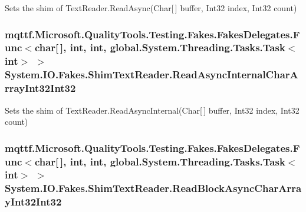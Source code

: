 Sets the shim of Text\-Reader.\-Read\-Async(\-Char\mbox{[}$\,$\mbox{]} buffer, Int32 index, Int32 count)

\hypertarget{class_system_1_1_i_o_1_1_fakes_1_1_shim_text_reader_acd60c65af91032033b97ce9dbbd2d136}{
\subsubsection[{Read\-Async\-Internal\-Char\-Array\-Int32\-Int32}]{\setlength{\rightskip}{0pt plus 5cm}mqttf.\-Microsoft.\-Quality\-Tools.\-Testing.\-Fakes.\-Fakes\-Delegates.\-Func$<$char\mbox{[}$\,$\mbox{]}, int, int, global.\-System.\-Threading.\-Tasks.\-Task$<$int$>$ $>$ System.\-I\-O.\-Fakes.\-Shim\-Text\-Reader.\-Read\-Async\-Internal\-Char\-Array\-Int32\-Int32\hspace{0.3cm}{\ttfamily [set]}}}\label{class_system_1_1_i_o_1_1_fakes_1_1_shim_text_reader_acd60c65af91032033b97ce9dbbd2d136}


Sets the shim of Text\-Reader.\-Read\-Async\-Internal(\-Char\mbox{[}$\,$\mbox{]} buffer, Int32 index, Int32 count)

\hypertarget{class_system_1_1_i_o_1_1_fakes_1_1_shim_text_reader_a89be003501a65a2ed2c0d59c3f0c3761}{
\subsubsection[{Read\-Block\-Async\-Char\-Array\-Int32\-Int32}]{\setlength{\rightskip}{0pt plus 5cm}mqttf.\-Microsoft.\-Quality\-Tools.\-Testing.\-Fakes.\-Fakes\-Delegates.\-Func$<$char\mbox{[}$\,$\mbox{]}, int, int, global.\-System.\-Threading.\-Tasks.\-Task$<$int$>$ $>$ System.\-I\-O.\-Fakes.\-Shim\-Text\-Reader.\-Read\-Block\-Async\-Char\-Array\-Int32\-Int32\hspace{0.3cm}{\ttfamily [set]}}}\label{class_system_1_1_i_o_1_1_fakes_1_1_shim_text_reader_a89be003501a65a2ed2c0d59c3f0c3761}


